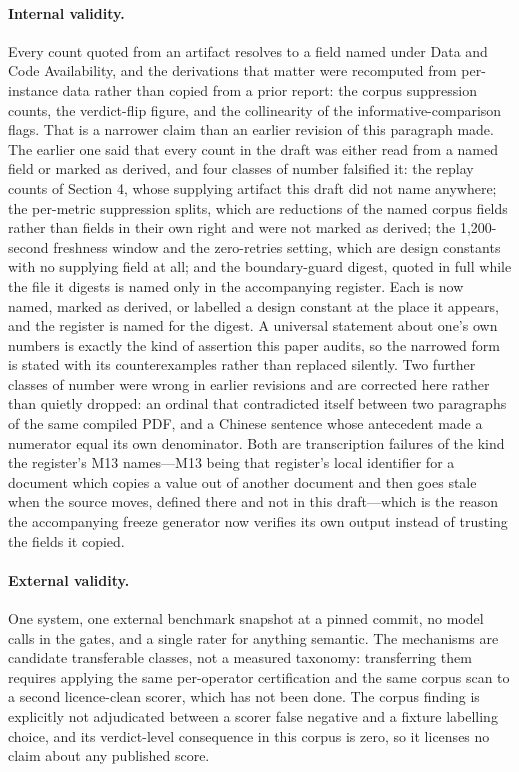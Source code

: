 \documentclass[11pt]{article}
\begin{document}
\paragraph{Internal validity.} Every count quoted from an artifact resolves to a field named under Data and Code Availability, and the derivations that matter were recomputed from per-instance data rather than copied from a prior report: the corpus suppression counts, the verdict-flip figure, and the collinearity of the informative-comparison flags. That is a narrower claim than an earlier revision of this paragraph made. The earlier one said that every count in the draft was either read from a named field or marked as derived, and four classes of number falsified it: the replay counts of Section 4, whose supplying artifact this draft did not name anywhere; the per-metric suppression splits, which are reductions of the named corpus fields rather than fields in their own right and were not marked as derived; the 1,200-second freshness window and the zero-retries setting, which are design constants with no supplying field at all; and the boundary-guard digest, quoted in full while the file it digests is named only in the accompanying register. Each is now named, marked as derived, or labelled a design constant at the place it appears, and the register is named for the digest. A universal statement about one's own numbers is exactly the kind of assertion this paper audits, so the narrowed form is stated with its counterexamples rather than replaced silently. Two further classes of number were wrong in earlier revisions and are corrected here rather than quietly dropped: an ordinal that contradicted itself between two paragraphs of the same compiled PDF, and a Chinese sentence whose antecedent made a numerator equal its own denominator. Both are transcription failures of the kind the register's M13 names---M13 being that register's local identifier for a document which copies a value out of another document and then goes stale when the source moves, defined there and not in this draft---which is the reason the accompanying freeze generator now verifies its own output instead of trusting the fields it copied.

\paragraph{External validity.} One system, one external benchmark snapshot at a pinned commit, no model calls in the gates, and a single rater for anything semantic. The mechanisms are candidate transferable classes, not a measured taxonomy: transferring them requires applying the same per-operator certification and the same corpus scan to a second licence-clean scorer, which has not been done. The corpus finding is explicitly not adjudicated between a scorer false negative and a fixture labelling choice, and its verdict-level consequence in this corpus is zero, so it licenses no claim about any published score.
\end{document}
